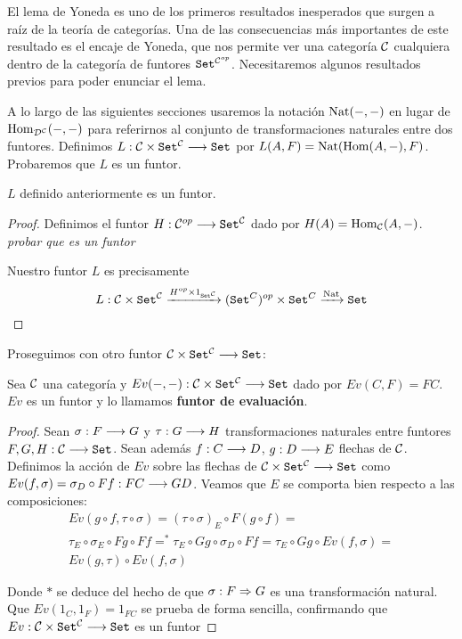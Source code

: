 El lema de Yoneda es uno de los primeros resultados
inesperados que surgen a raíz de la teoría de categorías. Una
de las consecuencias más importantes de este resultado es
el encaje de Yoneda, que nos permite
ver una categoría $\mathcal{C}$ cualquiera dentro de la categoría de
funtores $\texttt{Set}^{\mathcal{C}^{op}}$. Necesitaremos algunos resultados
previos para poder enunciar el lema.

A lo largo de las siguientes
secciones usaremos la notación $\operatorname{Nat}(-, -)$ en lugar de
$\operatorname{Hom}_{\mathcal{D}^{\mathcal{C}}}(-, -)$ para referirnos al conjunto de
transformaciones naturales entre dos funtores. Definimos
$L : \mathcal{C}\times\texttt{Set}^{\mathcal{C}}\longrightarrow \texttt{Set}$ por
$L(A, F) = \operatorname{Nat}(\operatorname{Hom}(A, -), F)$. Probaremos que $L$ es un funtor.

\begin{proposition*}
  $L$ definido anteriormente es un funtor.
\end{proposition*}
\begin{proof}
  Definimos el funtor
  $H: \mathcal{C}^{op}\longrightarrow \texttt{Set}^{\mathcal{C}}$ dado por
  $H(A) = \operatorname{Hom}_{\mathcal{C}}(A, -)$. \textit{probar que es un funtor}

  Nuestro funtor $L$ es precisamente
  $$L :\mathcal{C}\times\texttt{Set}^{\mathcal{C}}
  \xrightarrow{H^{op}\times 1_{\texttt{Set}^{\mathcal{C}}}}
  (\texttt{Set}^{C})^{op} \times \texttt{Set}^{C}
  \xrightarrow{\operatorname{Nat}} \texttt{Set}$$
\end{proof}
Proseguimos con otro funtor $\mathcal{C}\times\texttt{Set}^{\mathcal{C}}\longrightarrow \texttt{Set}$:

\begin{proposition*}
  Sea $\mathcal{C}$ una categoría y $Ev(-, -) : \mathcal{C}\times\texttt{Set}^{\mathcal{C}}\longrightarrow \texttt{Set}$
  dado por $Ev(C, F) = FC$. $Ev$ es un funtor y lo llamamos
  \textbf{funtor de evaluación}.
\end{proposition*}
\begin{proof}
  Sean $\sigma : F\longrightarrow G$ y $\tau : G\longrightarrow H$ transformaciones naturales entre funtores
  $F, G, H : \mathcal{C}\longrightarrow \texttt{Set}$. Sean además $f : C\longrightarrow D$,
  $g : D\longrightarrow E$ flechas de $\mathcal{C}$.
  Definimos la acción de $Ev$ sobre las flechas de
  $\mathcal{C}\times\texttt{Set}^{\mathcal{C}}\longrightarrow \texttt{Set}$ como
  $Ev(f, \sigma) = \sigma_D \circ Ff : FC\longrightarrow GD$. Veamos que $E$ se comporta bien
  respecto a las composiciones:
  \begin{multline*}
    Ev(g \circ f, \tau\circ\sigma) =
    (\tau \circ \sigma)_E\circ F(g\circ f) =\\
    \tau_E\circ\sigma_E\circ Fg \circ Ff =^*
  \tau_E\circ Gg \circ\sigma_D \circ Ff =
  \tau_E\circ Gg \circ Ev(f, \sigma) =\\
  Ev(g, \tau) \circ Ev(f, \sigma)
  \end{multline*}

  Donde $*$ se deduce del hecho de que $\sigma : F\Rightarrow G$ es una transformación
  natural.
  Que $Ev(1_C, 1_F) = 1_{FC}$ se prueba de forma sencilla,
  confirmando que $Ev : \mathcal{C}\times\texttt{Set}^{\mathcal{C}}\longrightarrow \texttt{Set}$ es un funtor
\end{proof}

